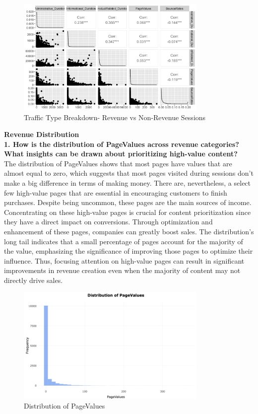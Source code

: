 \documentclass[12pt]{article}
\begin{document}
\begin{figure}[h]
    \centering
    \includegraphics[width=0.82\textwidth]{Correlation.png}  
    \caption{Traffic Type Breakdown- Revenue vs Non-Revenue Sessions}
\end{figure}
\vspace{0.5cm}

\newpage

\textbf{Revenue Distribution}\\

\textbf{1. How is the distribution of PageValues across revenue categories? What insights can be drawn about prioritizing high-value content?} \\[5pt] %

The distribution of PageValues shows that most pages have values that are almost equal to zero, which suggests that most pages visited during sessions don't make a big difference in terms of making money. There are, nevertheless, a select few high-value pages that are essential in encouraging customers to finish purchases. Despite being uncommon, these pages are the main sources of income. Concentrating on these high-value pages is crucial for content prioritization since they have a direct impact on conversions. Through optimization and enhancement of these pages, companies can greatly boost sales. The distribution's long tail indicates that a small percentage of pages account for the majority of the value, emphasizing the significance of improving those pages to optimize their influence. Thus, focusing attention on high-value pages can result in significant improvements in revenue creation even when the majority of content may not directly drive sales. 
\begin{figure}[h]
    \centering
    \includegraphics[width=0.82\textwidth]{Distribution of PageValues.png}  
    \caption{Distribution of PageValues}
\end{figure}
\vspace{0.5cm}
\end{document}
